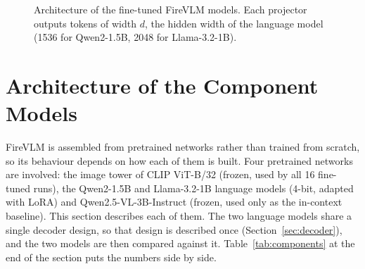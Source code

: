 \documentclass[12pt]{report}
\begin{document}
\begin{figure}[htbp]
  \centering
  \caption{Architecture of the fine-tuned FireVLM models. Each projector outputs tokens of width $d$, the hidden width of the language model (1536 for Qwen2-1.5B, 2048 for Llama-3.2-1B).}
  \label{fig:pipeline}
\end{figure}
\section{Architecture of the Component Models}
\label{sec:components}
FireVLM is assembled from pretrained networks rather than trained from scratch, so its behaviour depends on how each of them is built. Four pretrained networks are involved: the image tower of CLIP ViT-B/32 (frozen, used by all 16 fine-tuned runs), the Qwen2-1.5B and Llama-3.2-1B language models (4-bit, adapted with LoRA) and Qwen2.5-VL-3B-Instruct (frozen, used only as the in-context baseline). This section describes each of them. The two language models share a single decoder design, so that design is described once (Section~\ref{sec:decoder}), and the two models are then compared against it. Table~\ref{tab:components} at the end of the section puts the numbers side by side.
\end{document}
